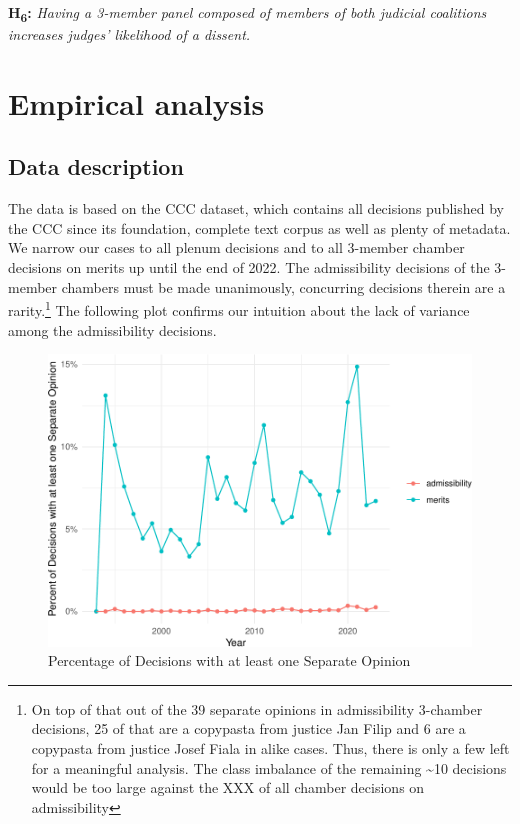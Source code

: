 \documentclass[
  11pt,
]{article}
\begin{document}
\textbf{H\textsubscript{6}:} \emph{Having a 3-member panel composed of
members of both judicial coalitions increases judges' likelihood of a
dissent.}

\hypertarget{empirical-analysis}{%
\section{Empirical analysis}\label{empirical-analysis}}

\hypertarget{data-description}{%
\subsection{Data description}\label{data-description}}

The data is based on the CCC dataset, which contains all decisions
published by the CCC since its foundation, complete text corpus as well
as plenty of metadata. We narrow our cases to all plenum decisions and
to all 3-member chamber decisions on merits up until the end of 2022.
The admissibility decisions of the 3-member chambers must be made
unanimously, concurring decisions therein are a rarity.\footnote{On top
  of that out of the 39 separate opinions in admissibility 3-chamber
  decisions, 25 of that are a copypasta from justice Jan Filip and 6 are
  a copypasta from justice Josef Fiala in alike cases. Thus, there is
  only a few left for a meaningful analysis. The class imbalance of the
  remaining \textasciitilde10 decisions would be too large against the
  XXX of all chamber decisions on admissibility} The following plot
confirms our intuition about the lack of variance among the
admissibility decisions.

\begin{figure}
\centering
\includegraphics{separate_opinions_files/figure-latex/unnamed-chunk-1-1.pdf}
\caption{Percentage of Decisions with at least one Separate Opinion}
\end{figure}
\end{document}
